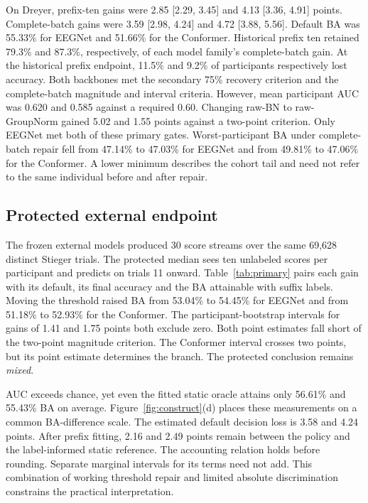 On Dreyer, prefix-ten gains were 2.85 [2.29, 3.45] and 4.13 [3.36, 4.91] points. Complete-batch gains were 3.59 [2.98, 4.24] and 4.72 [3.88, 5.56]. Default BA was 55.33\% for EEGNet and 51.66\% for the Conformer. Historical prefix ten retained 79.3\% and 87.3\%, respectively, of each model family's complete-batch gain. At the historical prefix endpoint, 11.5\% and 9.2\% of participants respectively lost accuracy. Both backbones met the secondary 75\% recovery criterion and the complete-batch magnitude and interval criteria. However, mean participant AUC was 0.620 and 0.585 against a required 0.60. Changing raw-BN to raw-GroupNorm gained 5.02 and 1.55 points against a two-point criterion. Only EEGNet met both of these primary gates. Worst-participant BA under complete-batch repair fell from 47.14\% to 47.03\% for EEGNet and from 49.81\% to 47.06\% for the Conformer. A lower minimum describes the cohort tail and need not refer to the same individual before and after repair.

\subsection{Protected external endpoint}
\begin{table}[t]
\caption{External cohort, 62 participants. Top rows give absolute percentages on the protected suffix for prefix ten. Bottom rows give prior-quantile gains in points versus the default on each rule's evaluation rows (Table~\ref{tab:contracts}). Brackets give marginal 95\% participant intervals. Gain intervals use the post-confirmation bootstrap.}\label{tab:primary}
\centering\small\setlength{\tabcolsep}{4pt}\end{table}

The frozen external models produced 30 score streams over the same 69,628 distinct Stieger trials. The protected median sees ten unlabeled scores per participant and predicts on trials 11 onward. Table~\ref{tab:primary} pairs each gain with its default, its final accuracy and the BA attainable with suffix labels. Moving the threshold raised BA from 53.04\% to 54.45\% for EEGNet and from 51.18\% to 52.93\% for the Conformer. The participant-bootstrap intervals for gains of 1.41 and 1.75 points both exclude zero. Both point estimates fall short of the two-point magnitude criterion. The Conformer interval crosses two points, but its point estimate determines the branch. The protected conclusion remains \emph{mixed}.

AUC exceeds chance, yet even the fitted static oracle attains only 56.61\% and 55.43\% BA on average. Figure~\ref{fig:construct}(d) places these measurements on a common BA-difference scale. The estimated default decision loss is 3.58 and 4.24 points. After prefix fitting, 2.16 and 2.49 points remain between the policy and the label-informed static reference. The accounting relation holds before rounding. Separate marginal intervals for its terms need not add. This combination of working threshold repair and limited absolute discrimination constrains the practical interpretation.


